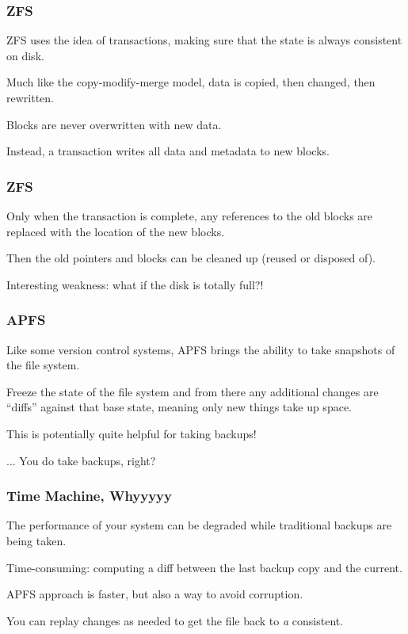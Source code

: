 \begin{frame}
	\frametitle{ZFS}

	ZFS uses the idea of transactions, making sure that the state is always consistent on disk.

	Much like the copy-modify-merge model, data is copied, then changed, then rewritten.

	Blocks are never overwritten with new data.

	Instead, a transaction writes all data and metadata to new blocks.

\end{frame}


\begin{frame}
	\frametitle{ZFS}

	Only when the transaction is complete, any references to the old blocks are replaced with the location of the new blocks.

	Then the old pointers and blocks can be cleaned up (reused or disposed of).

	Interesting weakness: what if the disk is totally full?!

\end{frame}

\begin{frame}
	\frametitle{APFS}

	Like some version control systems, APFS brings the ability to take snapshots of the file system.

	Freeze the state of the file system and from there any additional changes are ``diffs'' against that base state, meaning only new things take up space.

	This is potentially quite helpful for taking backups!


	... You do take backups, right?

\end{frame}


\begin{frame}
	\frametitle{Time Machine, Whyyyyy}

	The performance of your system can be degraded while traditional backups are being taken.

	Time-consuming: computing a diff between the last backup copy and the current.

	APFS approach is faster, but also a way to avoid corruption.

	You can replay changes as needed to get the file back to \textit{a} consistent.

\end{frame}


